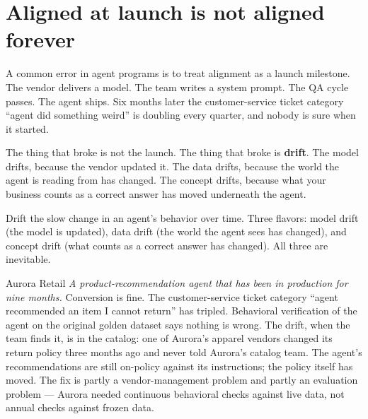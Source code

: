 \label{ch:10-alignment-04-oversight}

\starttwocol

\section{Aligned at launch is not aligned forever}

A common error in agent programs is to treat alignment as a launch milestone. The vendor delivers a model. The team writes a system prompt. The QA cycle passes. The agent ships. Six months later the customer-service ticket category ``agent did something weird'' is doubling every quarter, and nobody is sure when it started.

The thing that broke is not the launch. The thing that broke is \textbf{drift}. The model drifts, because the vendor updated it. The data drifts, because the world the agent is reading from has changed. The concept drifts, because what your business counts as a correct answer has moved underneath the agent.

\begin{TNdefinition}{Drift} the slow change in an agent's behavior over time. Three flavors: model drift (the model is updated), data drift (the world the agent sees has changed), and concept drift (what counts as a correct answer has changed). All three are inevitable. \end{TNdefinition}

\begin{TNinpractice}{Aurora Retail} \textit{A product-recommendation agent that has been in production for nine months.} Conversion is fine. The customer-service ticket category ``agent recommended an item I cannot return'' has tripled. Behavioral verification of the agent on the original golden dataset says nothing is wrong. The drift, when the team finds it, is in the catalog: one of Aurora's apparel vendors changed its return policy three months ago and never told Aurora's catalog team. The agent's recommendations are still on-policy against its instructions; the policy itself has moved. The fix is partly a vendor-management problem and partly an evaluation problem --- Aurora needed continuous behavioral checks against live data, not annual checks against frozen data. \end{TNinpractice}

